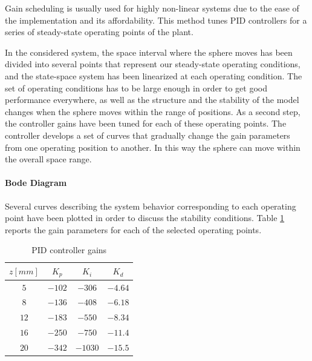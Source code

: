 Gain scheduling is usually used for highly non-linear systems due to the ease of the implementation and its affordability.
This method tunes PID controllers for a series of steady-state operating points of the plant.

In the considered system, the space interval where the sphere moves has been divided into several points that represent our steady-state operating conditions, and the state-space system has been linearized at each operating condition.
The set of operating conditions has to be large enough in order to get good performance everywhere, as well as the structure and the stability of the model changes when the sphere moves within the range of positions.
As a second step, the controller gains have been tuned for each of these operating points.
The controller develops a set of curves that gradually change the gain parameters from one operating position to another.
In this way the sphere can move within the overall space range.

\paragraph{Bode Diagram}

Several curves describing the system behavior corresponding to each operating point have been plotted in order to discuss the stability conditions.
Table \ref{tab:pid_gain_scheduling_gains} reports the gain parameters for each of the selected operating points.

\begin{table}[H]
    \centering

    \begin{tabular}{|c|c|c|c|}
        \hline
        $z [mm]$ & $K_p$  & $K_i$   & $K_d$   \\
        \hline
        $5$      & $-102$ & $-306$  & $-4.64$ \\
        $8$      & $-136$ & $-408$  & $-6.18$ \\
        $12$     & $-183$ & $-550$  & $-8.34$ \\
        $16$     & $-250$ & $-750$  & $-11.4$ \\
        $20$     & $-342$ & $-1030$ & $-15.5$ \\
        \hline
    \end{tabular}

    \caption{PID controller gains}
    \label{tab:pid_gain_scheduling_gains}

\end{table}


